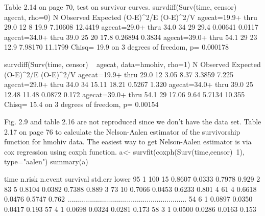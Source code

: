 \begin{frame}[fragile]
	
	Table 2.14 on page 70, test on survivor curves.
	survdiff(Surv(time, censor) ~ agecat, rho=0)
	N Observed Expected (O-E)^2/E (O-E)^2/V 
	agecat=19.9+ thru 29.0 12        8     19.9   7.10608   12.4419
	agecat=29.0+ thru 34.0 34       29     29.4   0.00641    0.0117
	agecat=34.0+ thru 39.0 25       20     17.8   0.26894    0.3834
	agecat=39.0+ thru 54.1 29       23     12.9   7.98170   11.1799
	Chisq= 19.9 on 3 degrees of freedom, p= 0.000178
	
\end{frame}
\begin{frame}[fragile]
	
	survdiff(Surv(time, censor) ~ agecat, data=hmohiv, rho=1)
	N Observed Expected (O-E)^2/E (O-E)^2/V 
	agecat=19.9+ thru 29.0 12     3.05     8.37    3.3859     7.225
	agecat=29.0+ thru 34.0 34    15.11    18.21    0.5267     1.320
	agecat=34.0+ thru 39.0 25    12.48    11.48    0.0872     0.172
	agecat=39.0+ thru 54.1 29    17.06     9.64    5.7134    10.355
	Chisq= 15.4 on 3 degrees of freedom, p= 0.00154 
	
\end{frame}
\begin{frame}[fragile]
	
	Fig. 2.9 and table 2.16 are not reproduced since we don't have the data set.
	Table 2.17 on page 76 to calculate the Nelson-Aalen estimator of the survivorship function for hmohiv data. The easiest way to get Nelson-Aalen estimator is via cox regression using coxph function.
	a<- survfit(coxph(Surv(time,censor)~1), type="aalen")
	summary(a)
	
\end{frame}
\begin{frame}[fragile]
	
	time n.risk n.event survival std.err lower 95%
	1    100      15   0.8607  0.0333       0.7978        0.929
	2     83       5   0.8104  0.0382       0.7388        0.889
	3     73      10   0.7066  0.0453       0.6233        0.801
	4     61       4   0.6618  0.0476       0.5747        0.762
	............................................................
	54      6       1   0.0897  0.0350       0.0417        0.193
	57      4       1   0.0698  0.0324       0.0281        0.173
	58      3       1   0.0500  0.0286       0.0163        0.153

	
\end{frame}
